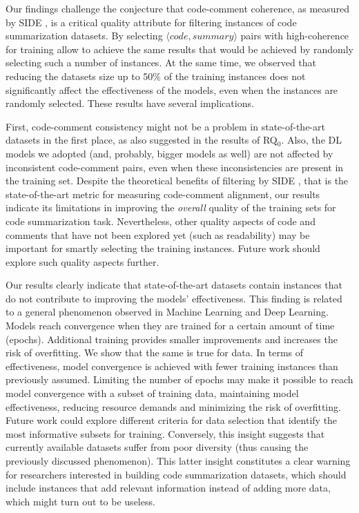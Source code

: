Our findings challenge the conjecture that code-comment coherence, as measured by SIDE \cite{mastropaolo2024evaluating}, is a critical quality attribute for filtering instances of code summarization datasets. By selecting $\langle code, summary \rangle$ pairs with high-coherence for training allow to achieve the same results that would be achieved by randomly selecting such a number of instances. At the same time, we observed that reducing the datasets size up to 50\% of the training instances does not significantly affect the effectiveness of the models, even when the instances are randomly selected. These results have several implications.

First, code-comment consistency might not be a problem in state-of-the-art datasets in the first place, as also suggested in the results of RQ$_0$. Also, the DL models we adopted (and, probably, bigger models as well) are not affected by inconsistent code-comment pairs, even when these inconsistencies are present in the training set.
Despite the theoretical benefits of filtering by SIDE \cite{mastropaolo2024evaluating}, that is the state-of-the-art metric for measuring code-comment alignment, our results indicate its limitations in improving the \textit{overall} quality of the training sets for code summarization task.
Nevertheless, other quality aspects of code and comments that have not been explored yet (such as readability) may be important for smartly selecting the training instances.
Future work should explore such quality aspects further.

Our results clearly indicate that state-of-the-art datasets contain instances that do not contribute to improving the models' effectiveness. This finding is related to a general phenomenon observed in Machine Learning and Deep Learning. Models reach convergence when they are trained for a certain amount of time (epochs). Additional training provides smaller improvements and increases the risk of overfitting. We show that the same is true for data. In terms of effectiveness, model convergence is achieved with fewer training instances than previously assumed. Limiting the number of epochs may make it possible to reach model convergence with a subset of training data, maintaining model effectiveness, reducing resource demands and minimizing the risk of overfitting.
Future work could explore different criteria for data selection that identify the most informative subsets for training.
Conversely, this insight suggests that currently available datasets suffer from poor diversity (thus causing the previously discussed phenomenon).
This latter insight constitutes a clear warning for researchers interested in building code summarization datasets, which should include instances that add relevant information instead of adding more data, which might turn out to be useless.

